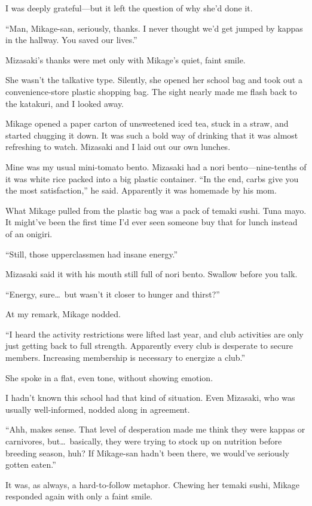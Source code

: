 \documentclass[
    a4paper,
    12pt,
    twoside,
    openany,
    UTF8,
    fontset=windows
]{ctexbook}
\begin{document}
I was deeply grateful---but it left the question of why she'd done it.

``Man, Mikage-san, seriously, thanks. I never thought we'd get jumped by kappas in the hallway. You saved our lives.''

Mizasaki's thanks were met only with Mikage's quiet, faint smile.

She wasn't the talkative type. Silently, she opened her school bag and took out a convenience-store plastic shopping bag. The sight nearly made me flash back to the katakuri, and I looked away.

Mikage opened a paper carton of unsweetened iced tea, stuck in a straw, and started chugging it down. It was such a bold way of drinking that it was almost refreshing to watch. Mizasaki and I laid out our own lunches.

Mine was my usual mini-tomato bento. Mizasaki had a nori bento---nine-tenths of it was white rice packed into a big plastic container. ``In the end, carbs give you the most satisfaction,'' he said. Apparently it was homemade by his mom.

What Mikage pulled from the plastic bag was a pack of temaki sushi. Tuna mayo. It might've been the first time I'd ever seen someone buy that for lunch instead of an onigiri.

``Still, those upperclassmen had insane energy.''

Mizasaki said it with his mouth still full of nori bento. Swallow before you talk.

``Energy, sure\dots\ but wasn't it closer to hunger and thirst?''

At my remark, Mikage nodded.

``I heard the activity restrictions were lifted last year, and club activities are only just getting back to full strength. Apparently every club is desperate to secure members. Increasing membership is necessary to energize a club.''

She spoke in a flat, even tone, without showing emotion.

I hadn't known this school had that kind of situation. Even Mizasaki, who was usually well-informed, nodded along in agreement.

``Ahh, makes sense. That level of desperation made me think they were kappas or carnivores, but\dots\ basically, they were trying to stock up on nutrition before breeding season, huh? If Mikage-san hadn't been there, we would've seriously gotten eaten.''

It was, as always, a hard-to-follow metaphor. Chewing her temaki sushi, Mikage responded again with only a faint smile.
\end{document}
